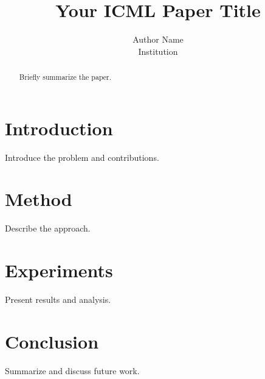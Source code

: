 \documentclass[11pt]{article}
\title{Your ICML Paper Title}
\author{Author Name \\ Institution}
\begin{document}
\maketitle

\begin{abstract}
Briefly summarize the paper.
\end{abstract}

\section{Introduction}
Introduce the problem and contributions.

\section{Method}
Describe the approach.

\section{Experiments}
Present results and analysis.

\section{Conclusion}
Summarize and discuss future work.



\end{document}

